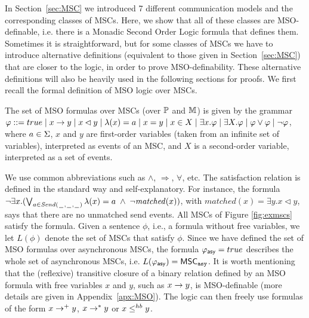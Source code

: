 
In Section~\ref{sec:MSC} we introduced 7 different communication models and the corresponding classes of MSCs. Here, we show that all of these classes are MSO-definable, i.e. there is a Monadic Second Order Logic formula that defines them. Sometimes it is straightforward, but for some classes of MSCs we have to introduce alternative definitions (equivalent to those given in Section~\ref{sec:MSC}) that are closer to the logic, in order to prove MSO-definability. These alternative definitions will also be heavily used in the following sections for proofs. We first recall the formal definition of MSO logic over MSCs.

\begin{definition}
The set of MSO formulas over MSCs (over $\mathbb{P}$ and $\mathbb{M}$) is given by the grammar
$
\varphi ::= true \mid x \to y \mid x \lhd y \mid \lambda(x) = a \mid x = y \mid x \in X \mid \exists x.\varphi \mid \exists X.\varphi \mid \varphi \vee \varphi \mid \neg \varphi
$,
where $a \in \Sigma$, $x$ and $y$ are first-order variables (taken from an infinite set of variables), interpreted as
events of an MSC, and $X$ is a second-order variable, interpreted
as a set of events.
\end{definition}

We use common abbreviations such as $\wedge$, $\Rightarrow$, $\forall$, etc. The satisfaction relation is defined in the standard way and self-explanatory.
For instance, the formula $\neg\exists x.(\bigvee_{a \in {\mathit{Send}(\hspace{0.1em}\underline{\hspace{0.5em}}\hspace{0.1em},\hspace{0.1em}\underline{\hspace{0.5em}}\hspace{0.1em},\hspace{0.1em}\underline{\hspace{0.5em}}\hspace{0.1em})}} \lambda(x) = a \;\wedge\; \neg \mathit{matched}(x))$,
with $\mathit{matched}(x) = \exists y.x \lhd y$,
says that there are no unmatched send events. All MSCs of Figure \ref{fig:exmscs} satisfy the formula. Given a sentence $\phi$, i.e., a formula without free variables,
we let $L(\phi)$ denote the set of MSCs that satisfy $\phi$. Since we have defined the set of MSO formulas over asynchronous MSCs, the formula $\varphi_{\mathsf{asy}} = true$ describes the whole set of asynchronous MSCs, i.e. $L(\varphi_{\mathsf{asy}}) = \mathsf{MSC}_{\mathtt{asy}}$. It is worth mentioning that the (reflexive) transitive closure of a binary relation defined by an MSO formula with free variables $x$ and $y$, such as $x \to y$, is MSO-definable (more details are given in Appendix~\ref{apx:MSO}). The logic can then freely use formulas of the form $x \to^+ y$, $x \to^* y$ or $x \leq^{hb} y$.

